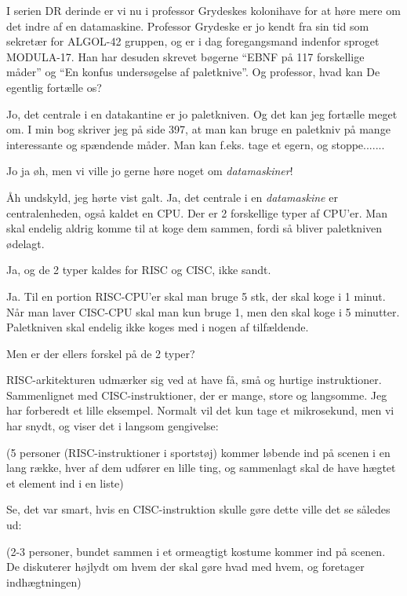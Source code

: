 \documentclass[a4paper,11pt]{article}
\begin{document}
\begin{sketch}

 I serien DR derinde er vi nu i professor
Grydeskes kolonihave for at høre mere om det indre af en datamaskine.
Professor Grydeske er jo kendt fra sin tid som sekretær for ALGOL-42
gruppen, og er i dag foregangsmand indenfor sproget MODULA-17. Han har
desuden skrevet bøgerne ``EBNF på 117 forskellige måder'' og ``En
konfus undersøgelse af paletknive''. Og professor, hvad kan De
egentlig fortælle os?

 Jo, det centrale i en datakantine er jo
paletkniven. Og det kan jeg fortælle meget om. I min bog skriver jeg
på side 397, at man kan bruge en paletkniv på mange interessante og
spændende måder. Man kan f.eks. tage et egern, og stoppe.......

 Jo ja øh, men vi ville jo gerne høre noget om
{\em datamaskiner}!

 {\AA}h undskyld, jeg hørte vist galt. Ja, det
centrale i en {\em datamaskine} er centralenheden, også kaldet en
CPU. Der er 2 forskellige typer af CPU'er. Man skal endelig aldrig
komme til at koge dem sammen, fordi så bliver paletkniven ødelagt.

 Ja, og de 2 typer kaldes for RISC og CISC, ikke sandt.

 Ja. Til en portion RISC-CPU'er skal man bruge 5
stk, der skal koge i 1 minut. Når man laver CISC-CPU skal man kun
bruge 1, men den skal koge i 5 minutter. Paletkniven skal endelig ikke
koges med i nogen af tilfældende.

 Men er der ellers forskel på de 2 typer?

 RISC-arkitekturen udmærker sig ved at have få,
små og hurtige instruktioner. Sammenlignet med CISC-instruktioner,
der er mange, store og langsomme. Jeg har forberedt et lille eksempel.
Normalt vil det kun tage et mikrosekund, men vi har snydt, og viser
det i langsom gengivelse:

\scene
(5 personer (RISC-instruktioner i sportstøj) kommer løbende ind på
scenen i en lang række, hver af dem udfører en lille ting, og
sammenlagt skal de have hægtet et element ind i en liste)

 Se, det var smart, hvis en CISC-instruktion skulle
gøre dette ville det se således ud:

\scene
(2-3 personer, bundet sammen i et ormeagtigt kostume kommer ind på
scenen. De diskuterer højlydt om hvem der skal gøre hvad med hvem,
og foretager indhægtningen)


\end{sketch}
\end{document}
